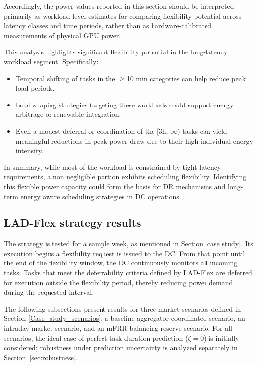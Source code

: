 \documentclass[preprint,12pt]{elsarticle}
\begin{document}
Accordingly, the power values reported in this section should be interpreted primarily as workload-level estimates for comparing flexibility potential across latency classes and time periods, rather than as hardware-calibrated measurements of physical GPU power.

This analysis highlights significant flexibility potential in the long-latency workload segment. Specifically:
\begin{itemize}
    \item Temporal shifting of tasks in the $\geq$10 min categories can help reduce peak load periods.
    \item Load shaping strategies targeting these workloads could support energy arbitrage or renewable integration.
    \item Even a modest deferral or coordination of the [3h, $\infty$) tasks can yield meaningful reductions in peak power draw due to their high individual energy intensity.
\end{itemize}

In summary, while most of the workload is constrained by tight latency requirements, a non negligible portion exhibits scheduling flexibility. Identifying this flexible power capacity could form the basis for DR mechanisms and long-term energy aware scheduling strategies in DC operations.





\subsection{LAD-Flex strategy results} \label{LAD_flex_results}

The strategy is tested for a sample week, as mentioned in Section \ref{case study}. Its execution begins a flexibility request is issued to the DC. From that point until the end of the flexibility window, the DC continuously monitors all incoming tasks. Tasks that meet the deferrability criteria defined by LAD-Flex are deferred for execution outside the flexibility period, thereby reducing power demand during the requested interval.

The following subsections present results for three market scenarios defined in Section \ref{Case_study_scenarios}: a baseline aggregator-coordinated scenario, an intraday market scenario, and an mFRR balancing reserve scenario. For all scenarios, the ideal case of perfect task duration prediction ($\zeta = 0$) is initially considered; robustness under prediction uncertainty is analyzed separately in Section~\ref{sec:robustness}.
\end{document}

